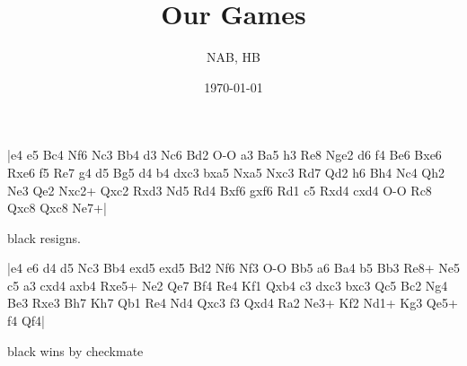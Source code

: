 \documentclass[twocolumn]{article}
\begin{document}
 \title{Our Games}
 \author{NAB, HB}
 \date{\today}
 \maketitle{}

\makegametitle

|e4 e5 Bc4 Nf6 Nc3 Bb4 d3 Nc6 Bd2 O-O a3 Ba5 h3 Re8 Nge2 d6 f4 Be6 Bxe6 Rxe6 f5 Re7 g4 d5 Bg5 d4 b4 dxc3 bxa5 Nxa5 Nxc3 Rd7 Qd2 h6 Bh4 Nc4 Qh2 Ne3 Qe2 Nxc2+ Qxc2 Rxd3 Nd5 Rd4 Bxf6 gxf6 Rd1 c5 Rxd4 cxd4 O-O Rc8 Qxc8 Qxc8 Ne7+| 

\showboard

black resigns.

\makegametitle

|e4 e6 d4 d5 Nc3 Bb4 exd5 exd5 Bd2 Nf6 Nf3 O-O Bb5 a6 Ba4 b5 Bb3 Re8+ Ne5 c5 a3 cxd4 axb4 Rxe5+ Ne2 Qe7 Bf4 Re4 Kf1 Qxb4 c3 dxc3 bxc3 Qc5 Bc2 Ng4 Be3 Rxe3 Bh7 Kh7 Qb1 Re4 Nd4 Qxc3 f3 Qxd4 Ra2 Ne3+ Kf2 Nd1+ Kg3 Qe5+ f4 Qf4|

\showboard

black wins by checkmate




\end{document}
